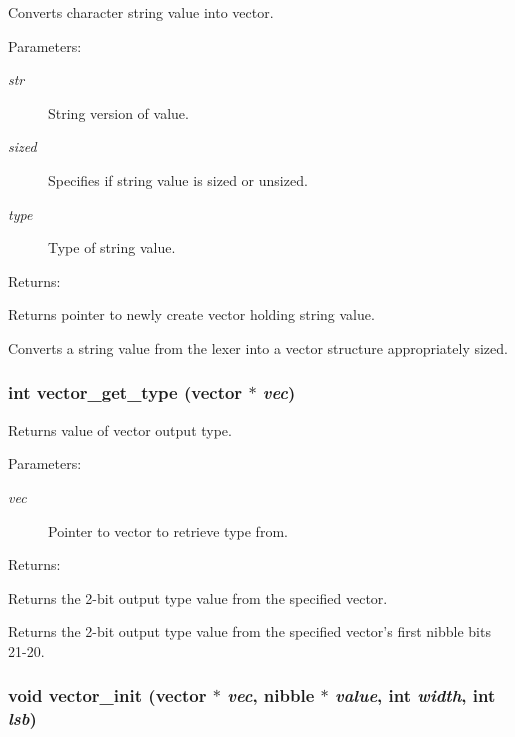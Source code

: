 Converts character string value into vector.

\begin{Desc}
\item[Parameters: ]\par
\begin{description}
\item[{\em 
str}]String version of value. \item[{\em 
sized}]Specifies if string value is sized or unsized. \item[{\em 
type}]Type of string value.\end{description}
\end{Desc}
\begin{Desc}
\item[Returns: ]\par
Returns pointer to newly create vector holding string value.\end{Desc}
Converts a string value from the lexer into a vector structure appropriately sized. 
\subsubsection{\setlength{\rightskip}{0pt plus 5cm}int vector\_\-get\_\-type ({\bf vector} $\ast$ {\em vec})}\label{vector_8c_a26}


Returns value of vector output type.

\begin{Desc}
\item[Parameters: ]\par
\begin{description}
\item[{\em 
vec}]Pointer to vector to retrieve type from.\end{description}
\end{Desc}
\begin{Desc}
\item[Returns: ]\par
Returns the 2-bit output type value from the specified vector.\end{Desc}
Returns the 2-bit output type value from the specified vector's first nibble bits 21-20. 
\subsubsection{\setlength{\rightskip}{0pt plus 5cm}void vector\_\-init ({\bf vector} $\ast$ {\em vec}, {\bf nibble} $\ast$ {\em value}, int {\em width}, int {\em lsb})}\label{vector_8c_a7}


